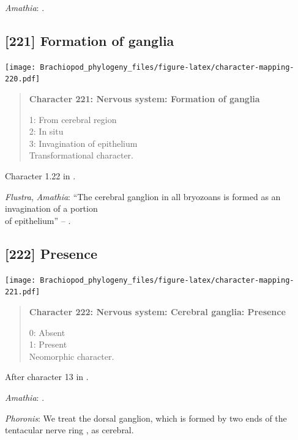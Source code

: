 \documentclass[openany]{book}
\begin{document}
\hypertarget{Amathia-coding-220}{}
\emph{Amathia}: \citet{Temereva2016Thenervous}.

\subsection*{{[}221{]} Formation of ganglia}\label{formation-of-ganglia}

\texttt{[image: Brachiopod\_phylogeny\_files/figure-latex/character-mapping-220.pdf]}

\begin{quote}
\textbf{Character 221: Nervous system: Formation of ganglia}

1: From cerebral region\\
2: In situ\\
3: Invagination of epithelium\\
Transformational character.
\end{quote}

Character 1.22 in \citet{SPS1996}.

\hypertarget{Amathia-coding-221}{}
\emph{Flustra}, \emph{Amathia}: ``The cerebral ganglion in all bryozoans
is formed as an invagination of a portion\\
of epithelium'' -- \citet{Temereva2016Thenervous}.

\subsection*{{[}222{]} Presence}\label{presence-5}

\texttt{[image: Brachiopod\_phylogeny\_files/figure-latex/character-mapping-221.pdf]}

\begin{quote}
\textbf{Character 222: Nervous system: Cerebral ganglia: Presence}

0: Absent\\
1: Present\\
Neomorphic character.
\end{quote}

After character 13 in \citet{Haszprunar1996}.

\hypertarget{Amathia-coding-222}{}
\emph{Amathia}: \citet{Temereva2016Thenervous}.

\hypertarget{Phoronis-coding-222}{}
\emph{Phoronis}: We treat the dorsal ganglion, which is formed by two
ends of the tentacular nerve ring \citep{Temereva2016Phoronida}, as
cerebral.
\end{document}
